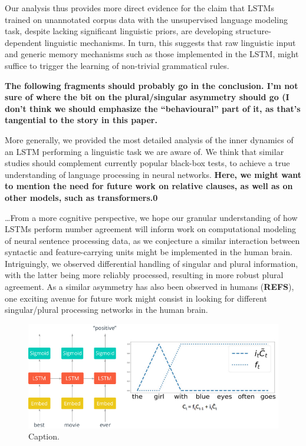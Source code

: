 Our analysis thus provides more direct evidence for the claim that
LSTMs trained on unannotated corpus data with the unsupervised
language modeling task, despite lacking significant linguistic priors,
are developing structure-dependent linguistic mechanisms. In turn,
this suggests that raw linguistic input and generic memory mechanisms
such as those implemented in the LSTM, might suffice to trigger the
learning of non-trivial grammatical rules.

\textbf{The following fragments should probably go in the
  conclusion. I'm not sure of where the bit on the plural/singular
  asymmetry should go (I don't think we should emphasize the
  ``behavioural'' part of it, as that's tangential to the story in
  this paper.}

More generally, we provided the most detailed analysis of the inner
dynamics of an LSTM performing a linguistic task we are aware of. We
think that similar studies should complement currently popular
black-box tests, to achieve a true understanding of language
processing in neural networks. \textbf{Here, we might want to mention
  the need for future work on relative clauses, as well as on other
  models, such as transformers.0}

\ldots From a more cognitive perspective, we hope our granular
understanding of how LSTMs perform number agreement will inform work
on computational modeling of neural sentence processing data, as we
conjecture a similar interaction between syntactic and
feature-carrying units might be implemented in the human
brain. Intriguingly, we observed differential handling of singular and
plural information, with the latter being more reliably processed,
resulting in more robust plural agreement. As a similar asymmetry has
also been observed in humans (\textbf{REFS}), one exciting avenue for
future work might consist in looking for different singular/plural
processing networks in the human brain.


\begin{figure}
\includegraphics[width=\linewidth]{Figures/Figure1_intro.png}
\caption{Caption.}
\end{figure}
